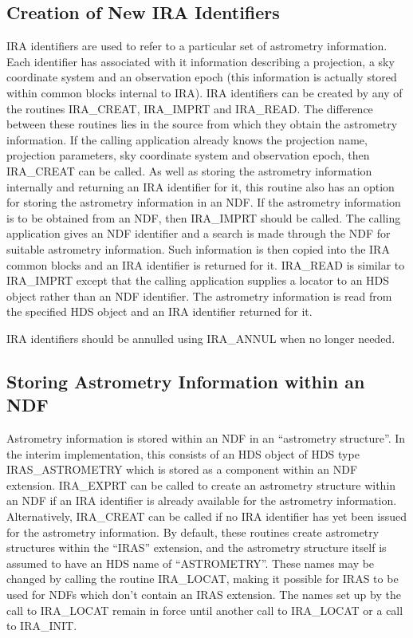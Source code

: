 \subsection {Creation of New IRA Identifiers}
IRA identifiers are used to refer to a particular set of astrometry information.
Each identifier has associated with it information describing a projection, a
sky coordinate system and an observation epoch (this information is actually
stored within common blocks internal to IRA). IRA identifiers can be created by
any of the routines IRA\_CREAT, IRA\_IMPRT and IRA\_READ. The difference between
these routines lies in the source from which they obtain the astrometry
information. If the calling application already knows the projection name,
projection parameters, sky coordinate system and observation epoch, then
IRA\_CREAT can be called. As well as storing the astrometry information
internally and returning an IRA identifier for it, this routine also has an
option for storing the astrometry information in an NDF. If the astrometry
information is to be obtained from an NDF, then IRA\_IMPRT should be called. The
calling application gives an NDF identifier and a search is made through the NDF
for suitable astrometry information. Such information is then copied into the
IRA common blocks and an IRA identifier is returned for it. IRA\_READ is similar
to IRA\_IMPRT except that the calling application supplies a locator to an HDS
object rather than an NDF identifier. The astrometry information is read from
the specified HDS object and an IRA identifier returned for it. 

IRA identifiers should be annulled using IRA\_ANNUL when no longer needed. 

\subsection {Storing Astrometry Information within an NDF}
Astrometry information is stored within an NDF in an ``astrometry structure''.
In the interim implementation, this consists of an HDS object of HDS type
IRAS\_ASTROMETRY which is stored as a component within an NDF extension.
IRA\_EXPRT can be called to create an astrometry structure within an NDF if an
IRA identifier is already available for the astrometry information.
Alternatively, IRA\_CREAT can be called if no IRA identifier has yet been issued
for the astrometry information. By default, these routines create astrometry
structures within the ``IRAS'' extension, and the astrometry structure itself is
assumed to have an HDS name of ``ASTROMETRY''. These names may be changed by
calling the routine IRA\_LOCAT, making it possible for IRAS to be used for NDFs
which don't contain an IRAS extension. The names set up by the call to
IRA\_LOCAT remain in force until another call to IRA\_LOCAT or a call to
IRA\_INIT. 

